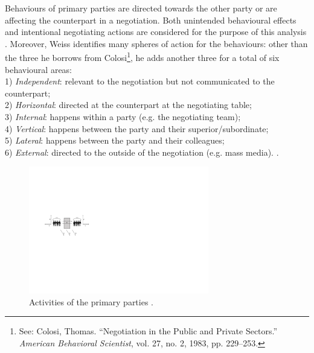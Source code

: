 \documentclass[../main.tex]{subfiles}
\begin{document}
Behaviours of primary parties are directed towards the other party or are affecting the counterpart in a negotiation. Both unintended behavioural effects and intentional negotiating actions are considered for the purpose of this analysis \autocite[279]{weiss}.
Moreover, Weiss identifies many spheres of action for the behaviours: other than the three he borrows from Colosi\footnote{See: Colosi, Thomas. “Negotiation in the Public and Private Sectors.” \textit{American Behavioral Scientist}, vol. 27, no. 2, 1983, pp. 229–253.}, he adds another three for a total of six behavioural areas:\\
1) \textit{Independent}: relevant to the negotiation but not communicated to the counterpart;\\
2) \textit{Horizontal}: directed at the counterpart at the negotiating table;\\
3) \textit{Internal}: happens within a party (e.g. the negotiating team);\\
4) \textit{Vertical}: happens between the party and their superior/subordinate;\\
5) \textit{Lateral}: happens between the party and their colleagues;\\
6) \textit{External}: directed to the outside of the negotiation (e.g. mass media). \autocite[286]{weiss}.

\begin{figure}[h]
    \centering\includegraphics[width=0.7\textwidth]{images/weissss.pdf}
    \caption{Activities of the primary parties \autocite[286]{weiss}.}
\end{figure}
\end{document}
